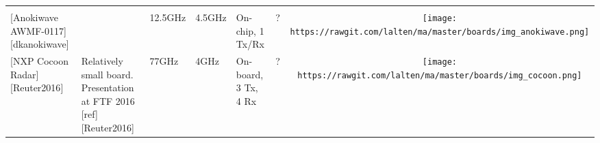 \begin{longtable}[]{@{}llllllc@{}}
\begin{minipage}[t]{0.10\columnwidth}
\strut
\end{minipage}\tabularnewline
\begin{minipage}[t]{0.09\columnwidth}\raggedright\strut
{[}Anokiwave AWMF-0117{]}{[}dkanokiwave{]}\strut
\end{minipage} & \begin{minipage}[t]{0.13\columnwidth}\raggedright\strut
\strut
\end{minipage} & \begin{minipage}[t]{0.09\columnwidth}\raggedright\strut
12.5GHz\strut
\end{minipage} & \begin{minipage}[t]{0.11\columnwidth}\raggedright\strut
4.5GHz\strut
\end{minipage} & \begin{minipage}[t]{0.10\columnwidth}\raggedright\strut
On-chip, 1 Tx/Rx\strut
\end{minipage} & \begin{minipage}[t]{0.15\columnwidth}\raggedright\strut
?\strut
\end{minipage} & \begin{minipage}[t]{0.10\columnwidth}\centering\strut
\texttt{[image: https://rawgit.com/lalten/ma/master/boards/img\_anokiwave.png]}\strut
\end{minipage}\tabularnewline
\begin{minipage}[t]{0.09\columnwidth}\raggedright\strut
{[}NXP Cocoon Radar{]}{[}Reuter2016{]}\strut
\end{minipage} & \begin{minipage}[t]{0.13\columnwidth}\raggedright\strut
Relatively small board. Presentation at FTF 2016
{[}ref{]}{[}Reuter2016{]}\strut
\end{minipage} & \begin{minipage}[t]{0.09\columnwidth}\raggedright\strut
77GHz\strut
\end{minipage} & \begin{minipage}[t]{0.11\columnwidth}\raggedright\strut
4GHz\strut
\end{minipage} & \begin{minipage}[t]{0.10\columnwidth}\raggedright\strut
On-board, 3 Tx, 4 Rx\strut
\end{minipage} & \begin{minipage}[t]{0.15\columnwidth}\raggedright\strut
?\strut
\end{minipage} & \begin{minipage}[t]{0.10\columnwidth}\centering\strut
\texttt{[image: https://rawgit.com/lalten/ma/master/boards/img\_cocoon.png]}\strut

\end{minipage}
\end{longtable}
